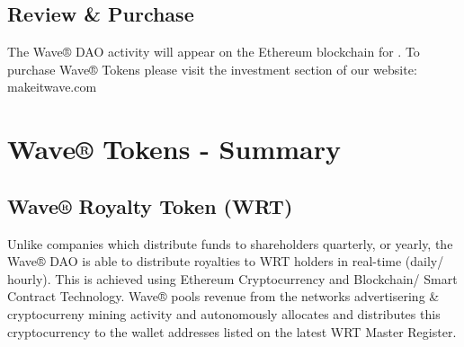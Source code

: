 \documentclass[letterpaper,10pt,english]{sphinxmanual}
\begin{document}
\section{Review \& Purchase}
\label{\detokenize{introduction:review-purchase}}
The Wave® DAO activity will appear on the Ethereum blockchain for .
To purchase Wave® Tokens please visit the investment section of our website: makeitwave.com


\chapter{Wave® Tokens - Summary}
\label{\detokenize{investors:wave-tokens-summary}}\label{\detokenize{investors::doc}}

\section{Wave® Royalty Token (WRT)}
\label{\detokenize{investors:wave-royalty-token-wrt}}
Unlike companies which distribute funds to shareholders quarterly, or yearly, the Wave® DAO is able to distribute royalties to WRT holders in real-time (daily/ hourly).
This is achieved using Ethereum Cryptocurrency and Blockchain/ Smart Contract Technology.
Wave® pools revenue from the networks advertisering \& cryptocurreny mining activity and autonomously allocates and distributes this cryptocurrency to the wallet addresses listed on the latest WRT Master Register.
\end{document}
